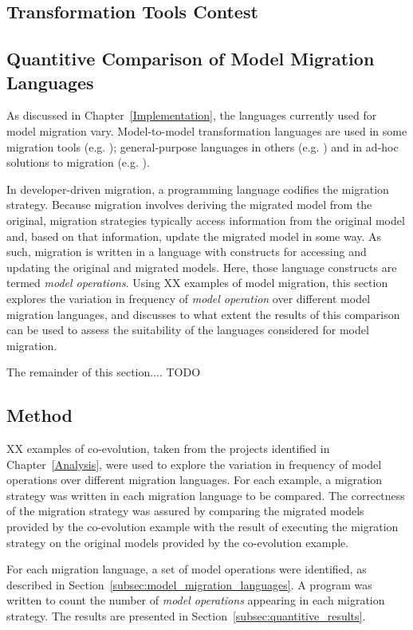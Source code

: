\subsection{Transformation Tools Contest}



\subsection{Quantitive Comparison of Model Migration Languages}
As discussed in Chapter~\ref{Implementation}, the languages currently used for model migration vary. Model-to-model transformation languages are used in some migration tools (e.g. \cite{cicchetti,garces}); general-purpose languages in others (e.g. \cite{ecore2ecore,cope}) and in ad-hoc solutions to migration (e.g. \cite{gmf}).

In developer-driven migration, a programming language codifies the migration strategy. Because migration involves deriving the migrated model from the original, migration strategies typically access information from the original model and, based on that information, update the migrated model in some way. As such, migration is written in a language with constructs for accessing and updating the original and migrated models. Here, those language constructs are termed \textit{model operations}. Using XX examples of model migration, this section explores the variation in frequency of \emph{model operation} over different model migration languages, and discusses to what extent the results of this comparison can be used to assess the suitability of the languages considered for model migration.

The remainder of this section.... TODO


\subsection{Method}
XX examples of co-evolution, taken from the projects identified in Chapter~\ref{Analysis}, were used to explore the variation in frequency of model operations over different migration languages. For each example, a migration strategy was written in each migration language to be compared. The correctness of the migration strategy was assured by comparing the migrated models provided by the co-evolution example with the result of executing the migration strategy on the original models provided by the co-evolution example.

For each migration language, a set of model operations were identified, as described in Section~\ref{subsec:model_migration_languages}. A program was written to count the number of \emph{model operations} appearing in each migration strategy. The results are presented in Section~\ref{subsec:quantitive_results}.

